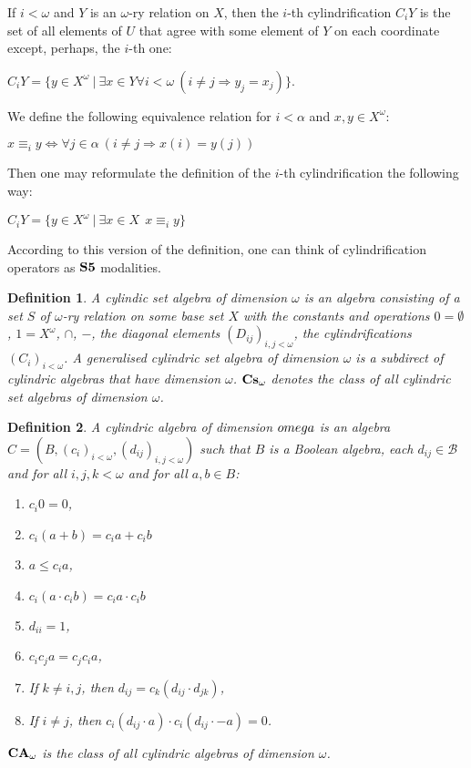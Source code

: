 \documentclass{article}
\theoremstyle{defin}
\newtheorem{definition}{Definition}
\theoremstyle{theorem}
\theoremstyle{claim}
\theoremstyle{prop}
\theoremstyle{lemma}
\theoremstyle{fact}
\theoremstyle{remark}
\theoremstyle{ex}
\theoremstyle{col}
\theoremstyle{question}
\begin{document}
If $i < \omega$ and $Y$ is an $\omega$-ry relation on $X$, then
the $i$-th cylindrification $C_i Y$ is the set of all elements of $U$ that agree with some element of $Y$ on each coordinate except, perhaps, the $i$-th one:
\begin{center}
$C_i Y = \{ y \in X^{\omega} \: |
\: \exists x \in Y \forall i < \omega \: (i \neq j \Rightarrow y_j = x_j)\}$.
\end{center}
We define the following equivalence relation for $i < \alpha$ and $x, y \in X^{\omega}$:
\begin{center}
 $x \equiv_i y \Leftrightarrow \forall j \in \alpha \: (i \neq j \Rightarrow x(i) = y(j))$
\end{center}
Then one may reformulate the definition of the $i$-th cylindrification the following way:

\begin{center}
 $C_i Y = \{ y \in X^{\omega} \: | \: \exists x \in X \:\: x \equiv_i y \}$
\end{center}

According to this version of the definition, one can think of cylindrification operators as ${\bf S5}$ modalities.

\begin{definition}
 A cylindic set algebra of dimension $\omega$ is an algebra consisting of a set $S$ of $\omega$-ry relation on some base set $X$
   with the constants and operations $0 = \emptyset$, $1 = X^{\omega}$, $\cap$, $-$, the diagonal elements $(D_{ij})_{i, j < \omega}$, the cylindrifications $(C_i)_{i < \omega}$. A generalised cylindric set algebra of dimension $\omega$ is a subdirect of cylindric algebras that have dimension $\omega$.
   ${\bf Cs}_{\omega}$ denotes the class of all cylindric set algebras of dimension $\omega$.
\end{definition}

\begin{definition}
   A cylindric algebra of dimension $\\omega$ is an algebra $C = (B,  (c_i)_{i < \omega}, (d_{ij})_{i, j < \omega})$ such that $B$ is a Boolean algebra, each $d_{ij} \in \mathcal{B}$ and for all $i, j, k < \omega$ and for all $a, b \in B$:
   \begin{enumerate}
     \item $c_i 0 = 0$,
     \item $c_i (a + b) = c_i a + c_i b$
     \item $a \leq c_i a$,
     \item $c_i (a \cdot c_i b) = c_i a \cdot c_i b$
     \item $d_{ii} = 1$,
     \item $c_i c_j a = c_j c_i a$,
     \item If $k \neq i, j$, then $d_{ij} = c_k (d_{ij} \cdot d_{jk})$,
     \item If $i \neq j$, then $c_i (d_{ij} \cdot a) \cdot c_i (d_{ij} \cdot - a) = 0$.
   \end{enumerate}
   ${\bf CA}_{\omega}$ is the class of all cylindric algebras of dimension $\omega$.
\end{definition}
\end{document}
